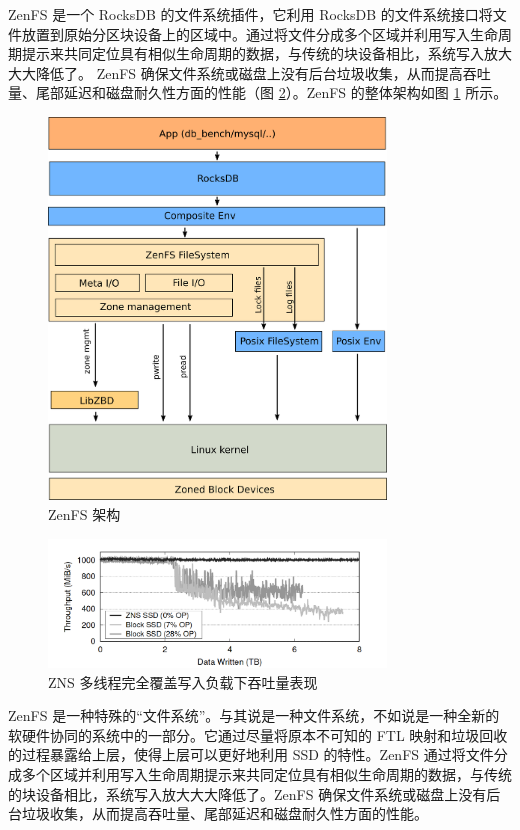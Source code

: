 ZenFS 是一个 RocksDB 的文件系统插件，它利用 RocksDB 的文件系统接口将文件放置到原始分区块设备上的区域中。通过将文件分成多个区域并利用写入生命周期提示来共同定位具有相似生命周期的数据，与传统的块设备相比，系统写入放大大大降低了。 ZenFS 确保文件系统或磁盘上没有后台垃圾收集，从而提高吞吐量、尾部延迟和磁盘耐久性方面的性能（图 \ref{zns-write}）。ZenFS 的整体架构如图 \ref{zenfs-overview} 所示。

\begin{figure}[htbp]
    \centering
    \includegraphics[width=0.8\textwidth]{fig/zenfs-overview}
    \caption{ZenFS 架构}
    \label{zenfs-overview}
\end{figure}

\begin{figure}[htbp]
    \centering
    \includegraphics[width=0.8\textwidth]{fig/zns-write}
    \caption{ZNS 多线程完全覆盖写入负载下吞吐量表现}
    \label{zns-write}
\end{figure}

ZenFS 是一种特殊的“文件系统”。与其说是一种文件系统，不如说是一种全新的软硬件协同的系统中的一部分。它通过尽量将原本不可知的 FTL 映射和垃圾回收的过程暴露给上层，使得上层可以更好地利用 SSD 的特性。ZenFS 通过将文件分成多个区域并利用写入生命周期提示来共同定位具有相似生命周期的数据，与传统的块设备相比，系统写入放大大大降低了。ZenFS 确保文件系统或磁盘上没有后台垃圾收集，从而提高吞吐量、尾部延迟和磁盘耐久性方面的性能。

